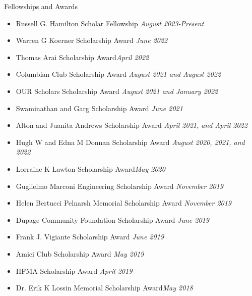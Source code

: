 \documentclass{CV} %
\begin{document}

\begin{rSection}{Fellowships and Awards}
    \begin{itemize}
        \item Russell G. Hamilton Scholar Fellowship \hfill \textit{August 2023-Present}
        \item Warren G Koerner Scholarship Award \hfill \textit{June 2022}
        \item Thomas Arai Scholarship Award\hfill \textit{April 2022}
        \item Columbian Club Scholarship Award \hfill \textit{August 2021 and August 2022}
        \item OUR Scholars Scholarship Award \hfill \textit{August 2021 and January 2022}
        \item Swaminathan and Garg Scholarship Award \hfill \textit{June 2021}
        \item Alton and Juanita Andrews Scholarship Award \hfill \textit{April 2021, and April 2022}
        \item Hugh W and Edna M Donnan Scholarship Award \hfill \textit{August 2020, 2021, and 2022}
        \item Lorraine K Lawton Scholarship Award\hfill \textit{May 2020}
        \item Guglielmo Marconi Engineering Scholarship Award \hfill \textit{November 2019}
        \item Helen Bertucci Pelnarsh Memorial Scholarship Award \hfill \textit{November 2019}
        \item Dupage Community Foundation Scholarship Award \hfill \textit{June 2019}
        \item Frank J. Vigiante Scholarship Award \hfill \textit{June 2019}
        \item Amici Club Scholarship Award \hfill \textit{May 2019}
        \item HFMA Scholarship Award \hfill \textit{April 2019}
        \item Dr. Erik K Lossin Memorial Scholarship Award\hfill \textit{May 2018}
    \end{itemize}
\end{rSection}

\end{document}
